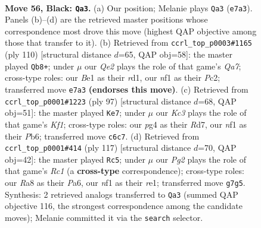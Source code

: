 \documentclass[11pt]{article}
\begin{document}
\clearpage

\begin{figure}[p]\centering
\begin{subfigure}{0.46\textwidth}\centering
\resizebox{\linewidth}{!}{%
\newchessgame
\chessboard[
  setfen={r5r1/p3q1p1/2k4p/3p1Q1P/p2P2P1/4P3/7K/4bN2 b - - 21 56},
  showmover=false,
  pgfstyle=straightmove, color=movearrow, markmove={e7-a3}
]}
\caption{}
\end{subfigure}\hfill
\begin{subfigure}{0.46\textwidth}\centering
\resizebox{\linewidth}{!}{%
\newchessgame
\chessboard[
  setfen={4k3/Q3p2p/2p2qp1/p7/P1R2P1P/1P6/K1P5/3r4 w - - 27 56},
  showmover=false,
  pgfstyle=straightmove, color=movearrow, markmove={a7-b8}
]}
\caption{}
\end{subfigure}
\\[4pt]
\begin{subfigure}{0.46\textwidth}\centering
\resizebox{\linewidth}{!}{%
\newchessgame
\chessboard[
  setfen={5k2/3r3p/1p1q2pP/p4pN1/P2P4/2Q3P1/1P3P2/6K1 b - - 22 49},
  showmover=false,
  pgfstyle=straightmove, color=movearrow, markmove={f8-e7}
]}
\caption{}
\end{subfigure}\hfill
\begin{subfigure}{0.46\textwidth}\centering
\resizebox{\linewidth}{!}{%
\newchessgame
\chessboard[
  setfen={2r3k1/1p4p1/p2P3p/P3P3/2p1Q3/5P1q/8/4R1K1 b - - 0 59},
  showmover=false,
  pgfstyle=straightmove, color=movearrow, markmove={c8-c5}
]}
\caption{}
\end{subfigure}
\caption{\textbf{Move 56, Black: \texttt{Qa3}.} (a) Our position; Melanie plays \texttt{Qa3} (\texttt{e7a3}). Panels (b)--(d) are the retrieved master positions whose correspondence most drove this move (highest QAP objective among those that transfer to it). (b) Retrieved from \texttt{ccrl\_top\_p0003\#1165} (ply 110) [structural distance $d$=65, QAP obj=58]: the master played \texttt{Qb8+}; under $\mu$ our \emph{Qe2} plays the role of that game's \emph{Qa7}; cross-type roles: our \emph{B}e1 as their \emph{r}d1, our \emph{n}f1 as their \emph{P}c2; transferred move \texttt{e7a3} \textbf{(endorses this move)}. (c) Retrieved from \texttt{ccrl\_top\_p0001\#1223} (ply 97) [structural distance $d$=68, QAP obj=51]: the master played \texttt{Ke7}; under $\mu$ our \emph{Kc3} plays the role of that game's \emph{Kf1}; cross-type roles: our \emph{p}g4 as their \emph{R}d7, our \emph{n}f1 as their \emph{P}b6; transferred move \texttt{c6c7}. (d) Retrieved from \texttt{ccrl\_top\_p0001\#414} (ply 117) [structural distance $d$=70, QAP obj=42]: the master played \texttt{Rc5}; under $\mu$ our \emph{Pg2} plays the role of that game's \emph{Rc1} (a \textbf{cross-type} correspondence); cross-type roles: our \emph{R}a8 as their \emph{P}a6, our \emph{n}f1 as their \emph{r}e1; transferred move \texttt{g7g5}. Synthesis: 2 retrieved analogs transferred to \texttt{Qa3} (summed QAP objective 116, the strongest correspondence among the candidate moves); Melanie committed it via the \texttt{search} selector.}
\label{fig:thought-m111}
\end{figure}
\end{document}
